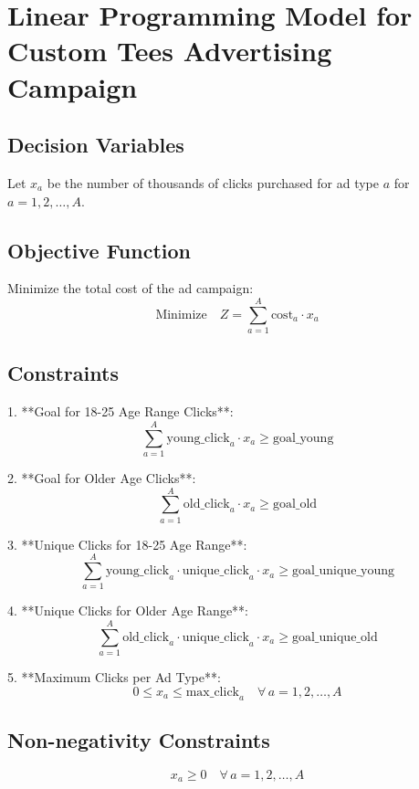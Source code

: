 \documentclass{article}
\begin{document}
\section*{Linear Programming Model for Custom Tees Advertising Campaign}

\subsection*{Decision Variables}
Let \( x_a \) be the number of thousands of clicks purchased for ad type \( a \) for \( a = 1, 2, \ldots, A \).

\subsection*{Objective Function}
Minimize the total cost of the ad campaign:
\[
\text{Minimize} \quad Z = \sum_{a=1}^{A} \text{cost}_a \cdot x_a
\]

\subsection*{Constraints}

1. **Goal for 18-25 Age Range Clicks**:
   \[
   \sum_{a=1}^{A} \text{young\_click}_a \cdot x_a \geq \text{goal\_young}
   \]

2. **Goal for Older Age Clicks**:
   \[
   \sum_{a=1}^{A} \text{old\_click}_a \cdot x_a \geq \text{goal\_old}
   \]

3. **Unique Clicks for 18-25 Age Range**:
   \[
   \sum_{a=1}^{A} \text{young\_click}_a \cdot \text{unique\_click}_a \cdot x_a \geq \text{goal\_unique\_young}
   \]

4. **Unique Clicks for Older Age Range**:
   \[
   \sum_{a=1}^{A} \text{old\_click}_a \cdot \text{unique\_click}_a \cdot x_a \geq \text{goal\_unique\_old}
   \]

5. **Maximum Clicks per Ad Type**:
   \[
   0 \leq x_a \leq \text{max\_click}_a \quad \forall \, a = 1, 2, \ldots, A
   \]

\subsection*{Non-negativity Constraints}
\[
x_a \geq 0 \quad \forall \, a = 1, 2, \ldots, A
\]
\end{document}
